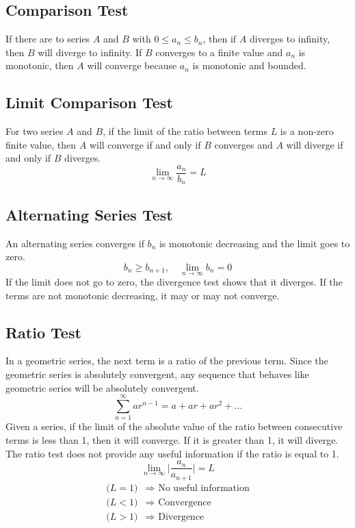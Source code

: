 \documentclass{article}
\theoremstyle{mytheoremstyle}
\theoremstyle{mytheoremstyle}
\theoremstyle{myproblemstyle}
\begin{document}
    \subsection*{Comparison Test}
    If there are to series $A$ and $B$ with $0\le a_n \le b_n$, then if $A$ diverges
    to infinity, then $B$ will diverge to infinity. If $B$ converges to a finite
    value and $a_n$ is monotonic, then $A$ will converge because $a_n$ is
    monotonic and bounded.

    \subsection*{Limit Comparison Test}
    For two series $A$ and $B$, if the limit of the ratio between terms $L$ is a
    non-zero finite value, then $A$ will converge if and only if $B$ converges
    and $A$ will diverge if and only if $B$ diverges.
    \[
        \lim_{n\to \infty} \frac{a_n}{b_n} = L
    \]

    \subsection*{Alternating Series Test}
    An alternating series converges if $b_n$ is monotonic decreasing and the
    limit goes to zero.
    \[
        b_n \ge b_{n+1}, \quad \lim_{n\to \infty} b_n = 0
    \]
    If the limit does not go to zero, the divergence test shows that it
    diverges. If the terms are not monotonic decreasing, it may or may not
    converge.

    \subsection*{Ratio Test}
    In a geometric series, the next term is a ratio of the previous term. Since
    the geometric series is absolutely convergent, any sequence that behaves
    like geometric series will be absolutely convergent.
    \[
        \sum_{n=1}^{\infty} ar^{n-1} = a + ar + ar^2 + \dots
    \]
    Given a series, if the limit of the absolute value of the ratio between
    consecutive terms is less than 1, then it will converge. If it is greater
    than 1, it will diverge. The ratio test does not provide any useful
    information if the ratio is equal to 1.
    \[
        \lim_{n\to \infty} \Big|\frac{a_n}{a_{n+1}}\Big| = L
    \]
    \begin{align*}
        \big(L = 1\big) &\Rightarrow \text{ No useful information} \\
        \big(L < 1\big) &\Rightarrow \text{ Convergence} \\
        \big(L > 1\big) &\Rightarrow \text{ Divergence} \\
    \end{align*}
\end{document}
